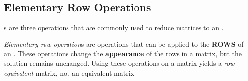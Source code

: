 \subsection{Elementary Row Operations}\label{subsec:Elementary_Row_Ops}
s are three operations that are commonly used to reduce matrices to an .

\begin{definition}\label{def:Elementary_Row_Op}
  \emph{Elementary row operation}s are  operations that can be applied to the \textbf{ROWS} of an .
  These operations change the \textbf{appearance} of the rows in a matrix, but the solution remains unchanged.
  Using these operations on a matrix yields a \emph{row-equivalent} matrix, not an equivalent matrix.
\end{definition}



